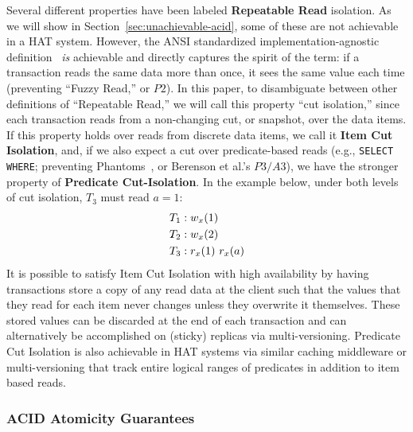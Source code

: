 Several different properties have been labeled \textbf{Repeatable
  Read} isolation. As we will show in
Section~\ref{sec:unachievable-acid}, some of these are not achievable
in a HAT system. However, the ANSI standardized
implementation-agnostic definition~\cite{ansi-sql} \textit{is}
achievable and directly captures the spirit of the term: if a
transaction reads the same data more than once, it sees the same value each
time (preventing ``Fuzzy Read,'' or $P2$). In this paper, to
disambiguate between other definitions of ``Repeatable Read,'' we will
call this property ``cut isolation,'' since each transaction reads
from a non-changing cut, or snapshot, over the data items. If this
property holds over reads from discrete data items, we call it
\textbf{Item Cut Isolation}, and, if we also expect a cut over
predicate-based reads (e.g., \texttt{SELECT WHERE}; preventing
Phantoms~\cite{gray-isolation}, or Berenson et al.'s $P3/A3$), we have
the stronger property of \textbf{Predicate Cut-Isolation}. In the
example below, under both levels of cut isolation, $T_3$ must read
$a=1$:
\begin{align*}
\small
T_1 &: w_x(1)
\\T_2 &: w_x(2)
\\T_3 &: r_x(1)~r_x(a)
\end{align*}
It is possible to satisfy Item Cut Isolation with high availability by
having transactions store a copy of any read data at the client such
that the values that they read for each item never changes unless they
overwrite it themselves. These stored values can be discarded at the
end of each transaction and can alternatively be accomplished on
(sticky) replicas via multi-versioning. Predicate Cut Isolation is
also achievable in HAT systems via similar caching middleware or
multi-versioning that track entire logical ranges of predicates in
addition to item based reads.

\subsubsection{ACID Atomicity Guarantees}
\label{sec:ta}

